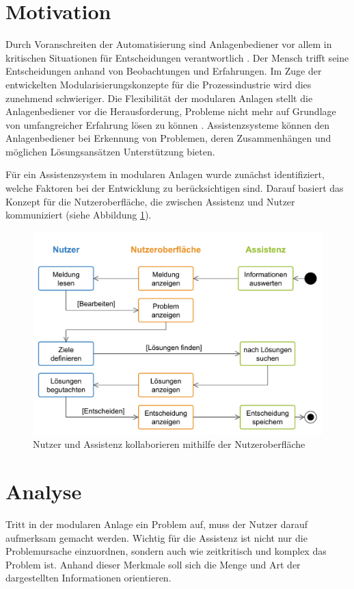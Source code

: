\documentclass{ifaPoster}
\begin{document}
\section{Motivation}
Durch Voranschreiten der Automatisierung sind Anlagenbediener vor allem in kritischen Situationen für Entscheidungen verantwortlich \cite{bainbridget_ironies_1983}. Der Mensch trifft seine Entscheidungen anhand von Beobachtungen und Erfahrungen. Im Zuge der entwickelten Modularisierungskonzepte für die Prozessindustrie wird dies zunehmend schwieriger. Die Flexibilität der modularen Anlagen stellt die Anlagenbediener vor die Herausforderung, Probleme nicht mehr auf Grundlage von umfangreicher Erfahrung lösen zu können \cite{mueller_2018}. Assistenzsysteme können den Anlagenbediener bei Erkennung von Problemen, deren Zusammenhängen und möglichen Lösungsansätzen Unterstützung bieten. 

Für ein Assistenzsystem in modularen Anlagen wurde zunächst identifiziert, welche Faktoren bei der Entwicklung zu berücksichtigen sind. Darauf basiert das Konzept für die Nutzeroberfläche, die zwischen Assistenz und Nutzer kommuniziert (siehe Abbildung \ref{Assistenzsystem}).

\begin{figure}[htbp]
\centering
\includegraphics[scale=0.67]{DA_files/Ablauf-Assistenzsystem.pdf}
\caption{Nutzer und Assistenz kollaborieren mithilfe der Nutzeroberfläche}
\label{Assistenzsystem}
\end{figure}

\section{Analyse}
Tritt in der modularen Anlage ein Problem auf, muss der Nutzer darauf aufmerksam gemacht werden. Wichtig für die Assistenz ist nicht nur die Problemursache einzuordnen, sondern auch wie zeitkritisch und komplex das Problem ist. Anhand dieser Merkmale soll sich die Menge und Art der dargestellten Informationen orientieren.
\end{document}

